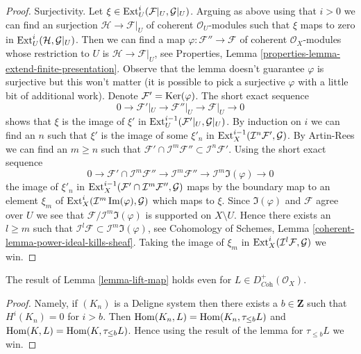 \begin{proof}
\medskip\noindent
Surjectivity. Let $\xi \in \mathop{\mathrm{Ext}}\nolimits^i_U(\mathcal{F}|_U, \mathcal{G}|_U)$.
Arguing as above using that $i > 0$ we can find an surjection
$\mathcal{H} \to \mathcal{F}|_U$ of coherent $\mathcal{O}_U$-modules
such that $\xi$ maps to zero in $\mathop{\mathrm{Ext}}\nolimits^i_U(\mathcal{H}, \mathcal{G}|_U)$.
Then we can find a map $\varphi : \mathcal{F}'' \to \mathcal{F}$
of coherent $\mathcal{O}_X$-modules whose restriction to $U$ is
$\mathcal{H} \to \mathcal{F}|_U$, see
Properties, Lemma \ref{properties-lemma-extend-finite-presentation}.
Observe that the lemma doesn't guarantee $\varphi$ is surjective
but this won't matter (it is possible to pick a surjective $\varphi$
with a little bit of additional work).
Denote $\mathcal{F}' = \mathop{\mathrm{Ker}}(\varphi)$. The short exact sequence
$$
0 \to \mathcal{F}'|_U \to \mathcal{F}''|_U \to \mathcal{F}|_U \to 0
$$
shows that $\xi$ is the image of $\xi'$ in
$\mathop{\mathrm{Ext}}\nolimits^{i - 1}_U(\mathcal{F}'|_U, \mathcal{G}|_U)$.
By induction on $i$ we can find an $n$ such that
$\xi'$ is the image of some $\xi'_n$ in
$\mathop{\mathrm{Ext}}\nolimits^{i - 1}_X(\mathcal{I}^n\mathcal{F}', \mathcal{G})$.
By Artin-Rees we can find an $m \geq n$ such that
$\mathcal{F}' \cap \mathcal{I}^m\mathcal{F}'' \subset
\mathcal{I}^n\mathcal{F}'$. Using the short exact sequence
$$
0 \to \mathcal{F}' \cap \mathcal{I}^m\mathcal{F}'' \to
\mathcal{I}^m\mathcal{F}'' \to \mathcal{I}^m\Im(\varphi) \to 0
$$
the image of $\xi'_n$ in
$\mathop{\mathrm{Ext}}\nolimits^{i - 1}_X(\mathcal{F}' \cap \mathcal{I}^m\mathcal{F}'', \mathcal{G})$
maps by the boundary map to an element $\xi_m$ of
$\mathop{\mathrm{Ext}}\nolimits^i_X(\mathcal{I}^m\mathop{\mathrm{Im}}(\varphi), \mathcal{G})$ which maps
to $\xi$. Since $\Im(\varphi)$ and $\mathcal{F}$ agree over $U$
we see that $\mathcal{F}/\mathcal{I}^m\Im(\varphi)$ is supported
on $X \setminus U$. Hence there exists an $l \geq m$
such that $\mathcal{I}^l\mathcal{F} \subset \mathcal{I}^m\Im(\varphi)$, see
Cohomology of Schemes, Lemma \ref{coherent-lemma-power-ideal-kills-sheaf}.
Taking the image of $\xi_m$ in
$\mathop{\mathrm{Ext}}\nolimits^i_X(\mathcal{I}^l\mathcal{F}, \mathcal{G})$ we win.
\end{proof}

\begin{lemma}
\label{lemma-lift-map-plus}
The result of Lemma \ref{lemma-lift-map} holds even for
$L \in D^+_{\textit{Coh}}(\mathcal{O}_X)$.
\end{lemma}

\begin{proof}
Namely, if $(K_n)$ is a Deligne system then there exists a
$b \in \mathbf{Z}$ such that $H^i(K_n) = 0$ for $i > b$.
Then $\mathop{\mathrm{Hom}}\nolimits(K_n, L) = \mathop{\mathrm{Hom}}\nolimits(K_n, \tau_{\leq b}L)$ and
$\mathop{\mathrm{Hom}}\nolimits(K, L) = \mathop{\mathrm{Hom}}\nolimits(K, \tau_{\leq b}L)$. Hence using
the result of the lemma for $\tau_{\leq b}L$ we win.
\end{proof}

